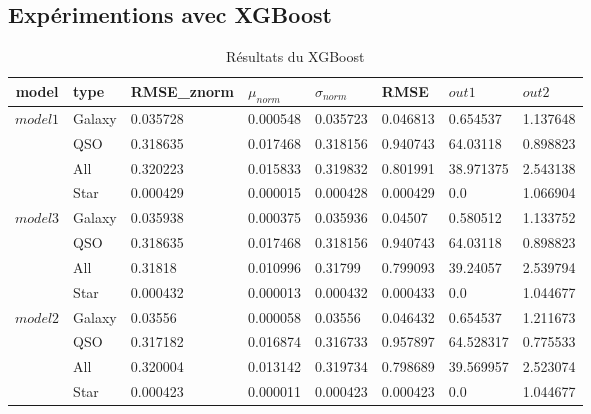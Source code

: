 \subsection{Expérimentions avec XGBoost}
\begin{table}[H]
	\centering
	\begin{tabular}{|c|l|l|l|l|l|l|l|}
		\hline
		model & type & RMSE\_znorm & $\mu_{norm}$ & $\sigma_{norm}$ & RMSE & $out1$ & $out2$ \\
		\hline
		
		\multirow{2}{1cm}{$model1$} & Galaxy  & 0.035728 & 0.000548 & 0.035723 & 0.046813 & 0.654537 & 1.137648 \\
		\cline{2-8}
		 & QSO & 0.318635  & 0.017468  & 0.318156  & 0.940743 & 64.03118 & 0.898823 \\
		 \cline{2-8}
		 & All & 0.320223  & 0.015833  & 0.319832  & 0.801991 & 38.971375 & 2.543138 \\
		 \cline{2-8}
		 & Star & 0.000429 & 0.000015  & 0.000428  & 0.000429 & 0.0       & 1.066904 \\
		 
		\hline
		\multirow{2}{1cm}{$model3$} & Galaxy  & 0.035938 & 0.000375 & 0.035936 & 0.04507 & 0.580512 & 1.133752 \\
		\cline{2-8}
		& QSO & 0.318635 & 0.017468 & 0.318156 & 0.940743 & 64.03118 & 0.898823 \\
		\cline{2-8}
		& All & 0.31818 & 0.010996 & 0.31799 & 0.799093	& 39.24057  & 2.539794 \\
		\cline{2-8}
		& Star & 0.000432 & 0.000013 & 0.000432 & 0.000433 & 0.0    & 1.044677 \\
		
		\hline
		\multirow{2}{1cm}{$model2$}& Galaxy & 0.03556 & 0.000058 & 0.03556 & 0.046432 & 0.654537 & 1.211673\\
		\cline{2-8}
		& QSO & 0.317182 & 0.016874 & 0.316733  & 0.957897	& 64.528317  & 	0.775533 \\
		\cline{2-8}
		& All & 0.320004 & 0.013142 & 0.319734 & 0.798689 & 39.569957 & 2.523074 \\
		\cline{2-8}
		&Star& 0.000423 & 0.000011 & 0.000423 & 0.000423 & 0.0 & 1.044677 \\
		\hline		
	\end{tabular}
	\caption{Résultats du XGBoost }	
\end{table}

